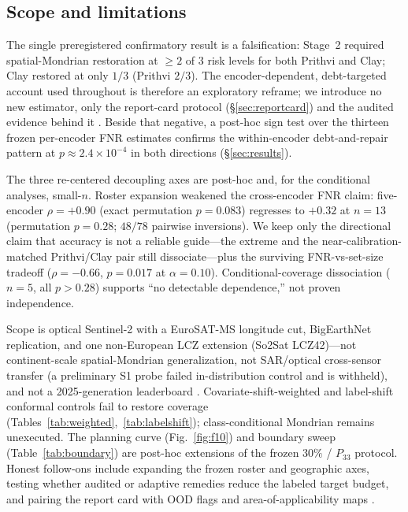 \documentclass[preprint,11pt,authoryear]{elsarticle}
\begin{document}
\subsection{Scope and limitations}\label{sec:limitations}
The single preregistered confirmatory result is a falsification: Stage~2 required spatial-Mondrian
restoration at $\ge2$ of $3$ risk levels for both Prithvi and Clay; Clay restored at only $1/3$
(Prithvi $2/3$). The encoder-dependent, debt-targeted account used throughout is therefore an
exploratory reframe; we introduce no new estimator, only the report-card protocol
(\S\ref{sec:reportcard}) and the audited evidence behind it
\citep{vovk2005algorithmic,angelopoulos2024crc}. Beside that negative, a post-hoc sign test over the
thirteen frozen per-encoder FNR estimates confirms the within-encoder debt-and-repair pattern at
$p\approx2.4\times10^{-4}$ in both directions (\S\ref{sec:results}).

The three re-centered decoupling axes are post-hoc and, for the conditional analyses, small-$n$.
Roster expansion weakened the cross-encoder FNR claim: five-encoder $\rho{=}+0.90$ (exact permutation
$p{=}0.083$) regresses to $+0.32$ at $n{=}13$ (permutation $p{=}0.28$; $48/78$ pairwise inversions). We
keep only the directional claim that accuracy is not a reliable guide---the extreme and the
near-calibration-matched Prithvi/Clay pair still dissociate---plus the surviving FNR-vs-set-size
tradeoff ($\rho{=}-0.66$, $p{=}0.017$ at $\alpha{=}0.10$). Conditional-coverage dissociation ($n{=}5$,
all $p>0.28$) supports ``no detectable dependence,'' not proven independence.

Scope is optical Sentinel-2 with a EuroSAT-MS longitude cut, BigEarthNet replication, and one
non-European LCZ extension (So2Sat LCZ42)---not continent-scale spatial-Mondrian generalization,
not SAR/optical cross-sensor transfer (a preliminary S1 probe failed in-distribution control and is
withheld), and not a 2025-generation leaderboard \citep{tseng2025galileo,danish2025terrafm}.
Covariate-shift-weighted and label-shift conformal controls fail to restore coverage
(Tables~\ref{tab:weighted},~\ref{tab:labelshift}); class-conditional Mondrian remains unexecuted. The
planning curve (Fig.~\ref{fig:f10}) and boundary sweep (Table~\ref{tab:boundary}) are post-hoc
extensions of the frozen $30\%$ / $P_{33}$ protocol. Honest follow-ons include expanding the frozen
roster and geographic axes, testing whether audited or adaptive remedies
\citep{zhou2026acp,gibbs2021adaptive,gibbs2024online} reduce the labeled target budget, and pairing
the report card with OOD flags and area-of-applicability maps
\citep{cohrs2025shrugfm,meyer2021aoa,tamazyan2025geocrossbench}.
\end{document}
